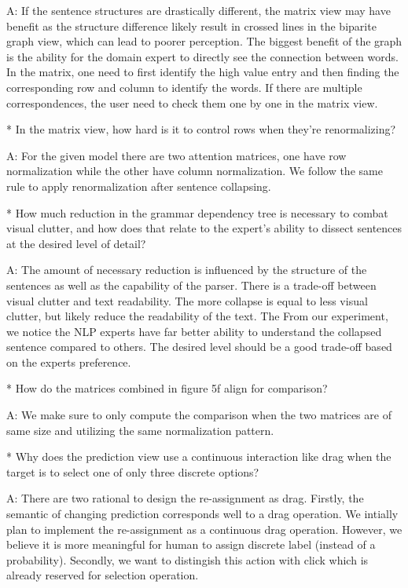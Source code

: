 A: If the sentence structures are drastically different, the matrix view may have benefit as the structure difference likely result in crossed lines in the biparite graph view, which can lead to poorer perception. The biggest benefit of the graph is the ability for the domain expert to directly see the connection between words. In the matrix, one need to first identify the high value entry and then finding the corresponding row and column to identify the words. If there are multiple correspondences, the user need to check them one by one in the matrix view.

* In the matrix view, how hard is it to control rows when they're renormalizing?

A: For the given model there are two attention matrices, one have row normalization while the other have column normalization. We follow the same rule to apply renormalization after sentence collapsing.

* How much reduction in the grammar dependency tree is necessary to combat visual clutter, and how does that relate to the expert's ability to dissect sentences at the desired level of detail?

A: The amount of necessary reduction is influenced by the structure of the sentences as well as the capability of the parser. There is a trade-off between visual clutter and text readability. The more collapse is equal to less visual clutter, but likely reduce the readability of the text. The From our experiment, we notice the NLP experts have far better ability to understand the collapsed sentence compared to others. The desired level should be a good trade-off based on the experts preference.

* How do the matrices combined in figure 5f align for comparison?

A: We make sure to only compute the comparison when the two matrices are of same size and utilizing the same normalization pattern.

* Why does the prediction view use a continuous interaction like drag when the target is to select one of only three discrete options?

A: There are two rational to design the re-assignment as drag. Firstly, the semantic of changing prediction corresponds well to a drag operation. We intially plan to implement the re-assignment as a continuous drag operation. However, we believe it is more meaningful for human to assign discrete label (instead of a probability). Secondly, we want to distingish this action with click which is already reserved for selection operation.

